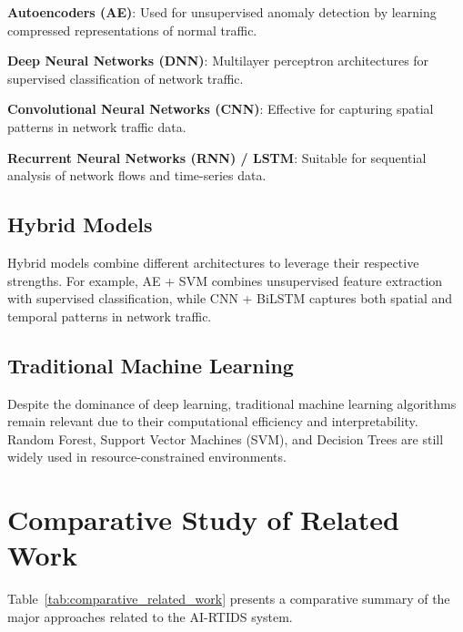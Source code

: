 \documentclass[12pt,a4paper]{report}
\begin{document}
\textbf{Autoencoders (AE)}: Used for unsupervised anomaly detection by learning compressed representations of normal traffic.

\textbf{Deep Neural Networks (DNN)}: Multilayer perceptron architectures for supervised classification of network traffic.

\textbf{Convolutional Neural Networks (CNN)}: Effective for capturing spatial patterns in network traffic data.

\textbf{Recurrent Neural Networks (RNN) / LSTM}: Suitable for sequential analysis of network flows and time-series data.

\subsection{Hybrid Models}

Hybrid models combine different architectures to leverage their respective strengths. For example, AE + SVM combines unsupervised feature extraction with supervised classification, while CNN + BiLSTM captures both spatial and temporal patterns in network traffic.

\subsection{Traditional Machine Learning}

Despite the dominance of deep learning, traditional machine learning algorithms remain relevant due to their computational efficiency and interpretability. Random Forest, Support Vector Machines (SVM), and Decision Trees are still widely used in resource-constrained environments.

\section{Comparative Study of Related Work}

Table~\ref{tab:comparative_related_work} presents a comparative summary of the major approaches related to the AI-RTIDS system.
\end{document}
